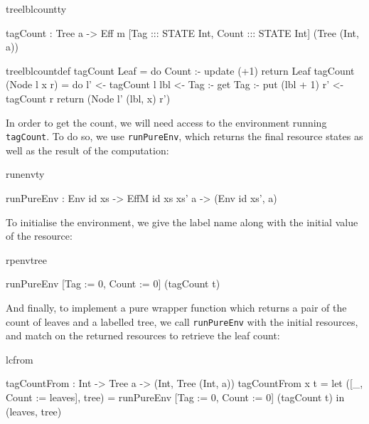 \begin{SaveVerbatim}{treelblcountty}

tagCount : Tree a -> Eff m [Tag   ::: STATE Int, 
                            Count ::: STATE Int] 
                              (Tree (Int, a))
\end{SaveVerbatim}
\begin{SaveVerbatim}{treelblcountdef}
tagCount Leaf
     = do Count :- update (+1)
          return Leaf
tagCount (Node l x r) 
     = do l' <- tagCount l
          lbl <- Tag :- get
          Tag :- put (lbl + 1)
          r' <- tagCount r
          return (Node l' (lbl, x) r')

\end{SaveVerbatim}



\noindent
In order to get the count, we will need access to the environment 
running \texttt{tagCount}. To do so, we use \texttt{runPureEnv}, which returns
the final resource states as well as the result of the computation:

\begin{SaveVerbatim}{runenvty}

runPureEnv : Env id xs -> 
             EffM id xs xs' a -> (Env id xs', a)

\end{SaveVerbatim}

\noindent
To initialise the environment, we give the label name along with the initial
value of the resource:

\begin{SaveVerbatim}{rpenvtree}

runPureEnv [Tag := 0, Count := 0] (tagCount t) 

\end{SaveVerbatim}

\noindent
And finally, to implement a pure wrapper function which returns a pair of the
count of leaves and a labelled tree, we call \texttt{runPureEnv} with the
initial resources, and match on the returned resources to retrieve the leaf
count:

\begin{SaveVerbatim}{lcfrom}

tagCountFrom : Int -> Tree a -> (Int, Tree (Int, a))
tagCountFrom x t 
    = let ([_, Count := leaves], tree) =
       runPureEnv [Tag := 0, Count := 0] (tagCount t)
          in (leaves, tree)

\end{SaveVerbatim}

